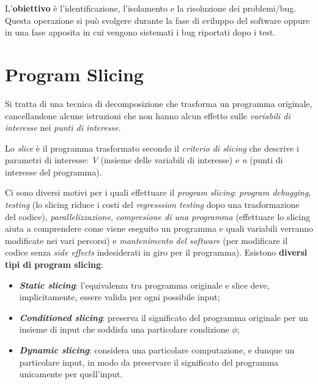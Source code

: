 \documentclass[a4paper, 11pt]{report}
\begin{document}
	L'\textbf{obiettivo} è l'identificazione, l'isolamento e la risoluzione dei problemi/bug. Questa operazione si può svolgere durante la fase di sviluppo del software oppure in una fase apposita in cui vengono sistemati i bug riportati dopo i test.
	
	\section*{Program Slicing}
	Si tratta di una tecnica di decomposizione che trasforma un programma originale, cancellandone alcune istruzioni che non hanno alcun effetto sulle \textit{variabili di interesse} nei \textit{punti di interesse}.
	
	Lo \textit{slice} è il programma trasformato secondo il \textit{criterio di slicing} che descrive i parametri di interesse: \textit{V} (insieme delle variabili di interesse) e \textit{n} (punti di interesse del programma).
	
	Ci sono diversi motivi per i quali effettuare il \textit{program slicing}: \textit{program debugging}, \textit{testing} (lo slicing riduce i costi del \textit{regresssion testing} dopo una trasformazione del codice), \textit{parallelizzazione},	\textit{compresione di una programma} (effettuare lo slicing aiuta a comprendere come viene eseguito un programma e quali variabili verranno modificate nei vari percorsi) e \textit{mantenimento del software} (per modificare il codice senza \textit{side effects} indesiderati in giro per il programma).
	\newline
	\newline
	\noindent
	Esistono \textbf{diversi tipi di program slicing}:
	\begin{itemize}
		\item \textit{\textbf{Static slicing}}: l'equivalenza tra programma originale e slice deve, implicitamente, essere valida per ogni possibile input;
		\item \textit{\textbf{Conditioned slicing}}: preserva il significato del programma originale per un insieme di input che soddisfa una particolare condizione $\phi$;
		\item \textit{\textbf{Dynamic slicing}}: considera una particolare computazione, e dunque un particolare input, in modo da preservare il significato del programma unicamente per quell'input.
	\end{itemize}
	
\end{document}
